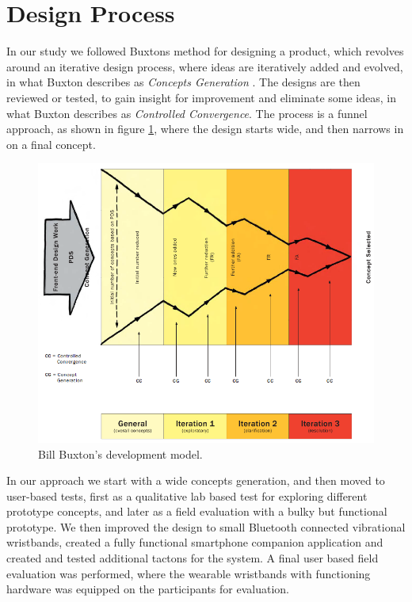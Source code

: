 \documentclass{sigchi}
\begin{document}
\section{Design Process}
In our study we followed Buxtons method for designing a product, which revolves around an iterative design process, where ideas are iteratively added and evolved, in what Buxton describes as \textit{Concepts Generation} \cite{buxton07}. The designs are then reviewed or tested, to gain insight for improvement and eliminate some ideas, in what Buxton describes as \textit{Controlled Convergence}. The process is a funnel approach, as shown in figure \ref{fig:1_development_model}, where the design starts wide, and then narrows in on a final concept.
\begin{figure}
\centering
  \includegraphics[width=1.02\columnwidth]{figures/1_development_model.png}
  \caption{Bill Buxton's development model.
}\label{fig:1_development_model}
\end{figure}
In our approach we start with a wide concepts generation, and then moved to user-based tests, first as a qualitative lab based test for exploring different prototype concepts, and later as a field evaluation with a bulky but functional prototype. We then improved the design to small Bluetooth connected vibrational wristbands, created a fully functional smartphone companion application and created and tested additional tactons for the system. A final user based field evaluation was performed, where the wearable wristbands with functioning hardware was equipped on the participants for evaluation.
\end{document}

